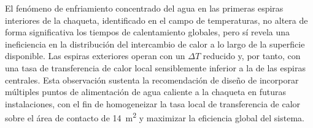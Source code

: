 El fen\'omeno de enfriamiento concentrado del agua en las primeras espiras interiores de la chaqueta, identificado en el campo de temperaturas, no altera de forma significativa los tiempos de calentamiento globales, pero s\'i revela una ineficiencia en la distribuci\'on del intercambio de calor a lo largo de la superficie disponible. Las espiras exteriores operan con un $\Delta T$ reducido y, por tanto, con una tasa de transferencia de calor local sensiblemente inferior a la de las espiras centrales. Esta observaci\'on sustenta la recomendaci\'on de dise\~no de incorporar m\'ultiples puntos de alimentaci\'on de agua caliente a la chaqueta en futuras instalaciones, con el fin de homogeneizar la tasa local de transferencia de calor sobre el \'area de contacto de 14~m\textsuperscript{2} y maximizar la eficiencia global del sistema.
